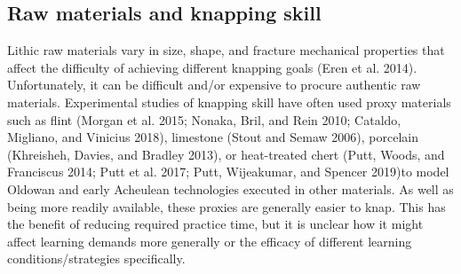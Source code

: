 \documentclass[smallextended]{svjour3}       %
\begin{document}
\hypertarget{raw-materials-and-knapping-skill}{%
\subsection{\texorpdfstring{\textbf{Raw materials and knapping
skill}}{Raw materials and knapping skill}}\label{raw-materials-and-knapping-skill}}

Lithic raw materials vary in size, shape, and fracture mechanical
properties that affect the difficulty of achieving different knapping
goals (Eren et al. 2014). Unfortunately, it can be difficult and/or
expensive to procure authentic raw materials. Experimental studies of
knapping skill have often used proxy materials such as flint (Morgan et
al. 2015; Nonaka, Bril, and Rein 2010; Cataldo, Migliano, and Vinicius
2018), limestone (Stout and Semaw 2006), porcelain (Khreisheh, Davies,
and Bradley 2013), or heat-treated chert (Putt, Woods, and Franciscus
2014; Putt et al. 2017; Putt, Wijeakumar, and Spencer 2019)to model
Oldowan and early Acheulean technologies executed in other materials. As
well as being more readily available, these proxies are generally easier
to knap. This has the benefit of reducing required practice time, but it
is unclear how it might affect learning demands more generally or the
efficacy of different learning conditions/strategies specifically.
\end{document}
